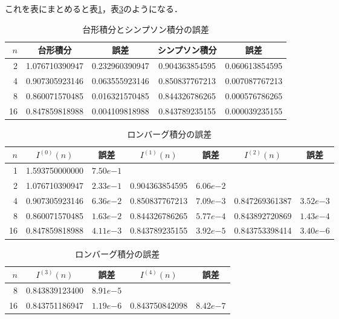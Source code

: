 \documentclass[a4paper]{bxjsarticle}
\begin{document}
	\noindent
	これを表にまとめると表\ref{tab:trap_simpson}，表\ref{tab:romberg}のようになる．

	\begin{table}[bt]
		\caption{台形積分とシンプソン積分の誤差}
		\label{tab:trap_simpson}
		\begin{center}
			\begin{tabular}{r|cc|cc}\hline
				$n$ & 台形積分 & 誤差 & シンプソン積分 & 誤差 \\ \hline
				2 & 1.076710390947 & 0.232960390947 & 0.904363854595 & 0.060613854595 \\
				4 & 0.907305923146 & 0.063555923146 & 0.850837767213 & 0.007087767213 \\
				8 & 0.860071570485 & 0.016321570485 & 0.844326786265 & 0.000576786265 \\
				16 & 0.847859818988 & 0.004109818988 & 0.843789235155 & 0.000039235155 \\ \hline
			\end{tabular}
		\end{center}
	\end{table}

	\begin{table}
		\caption{ロンバーグ積分の誤差}
		\label{tab:romberg}
		\begin{center}
			\begin{tabular}{r|cc|cc|cc} \hline
				$n$ & $I^{(0)}(n)$ & 誤差 & $I^{(1)}(n)$ & 誤差 & $I^{(2)}(n)$ & 誤差 \\ \hline
				 1 & 1.593750000000 & $7.50e{-1}$ &&&& \\
				 2 & 1.076710390947 & $2.33e{-1}$ & 0.904363854595 & $6.06e{-2}$ && \\
				 4 & 0.907305923146 & $6.36e{-2}$ & 0.850837767213 & $7.09e{-3}$ & 0.847269361387 & $3.52e{-3}$ \\
				 8 & 0.860071570485 & $1.63e{-2}$ & 0.844326786265 & $5.77e{-4}$ & 0.843892720869 & $1.43e{-4}$ \\
				16 & 0.847859818988 & $4.11e{-3}$ & 0.843789235155 & $3.92e{-5}$ & 0.843753398414 & $3.40e{-6}$ \\ \hline
			\end{tabular}
			\begin{tabular}{r|cc|cc} \hline
				$n$ & $I^{(3)}(n)$ & 誤差 & $I^{(4)}(n)$ & 誤差 \\ \hline
				 8 & 0.843839123400 & $8.91e{-5}$ && \\
				16 & 0.843751186947 & $1.19e{-6}$ & 0.843750842098 & $8.42e{-7}$ \\ \hline
			\end{tabular}
		\end{center}
	\end{table}
\end{document}

